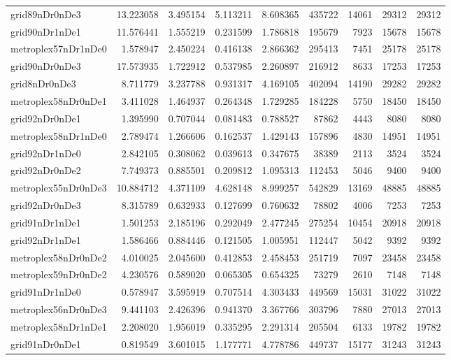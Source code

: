 \documentclass[../../../thesis.tex]{subfiles}
\begin{document}
\begin{longtable}{|l|r|r|r|r|r|r|r|r|}
grid89nDr0nDe3 & 13.223058 & 3.495154 & 5.113211 & 8.608365 & 435722 & 14061 & 29312 & 29312 \\
grid90nDr1nDe1 & 11.576441 & 1.555219 & 0.231599 & 1.786818 & 195679 & 7923 & 15678 & 15678 \\
metroplex57nDr1nDe0 & 1.578947 & 2.450224 & 0.416138 & 2.866362 & 295413 & 7451 & 25178 & 25178 \\
grid90nDr0nDe3 & 17.573935 & 1.722912 & 0.537985 & 2.260897 & 216912 & 8633 & 17253 & 17253 \\
grid8nDr0nDe3 & 8.711779 & 3.237788 & 0.931317 & 4.169105 & 402094 & 14190 & 29282 & 29282 \\
metroplex58nDr0nDe1 & 3.411028 & 1.464937 & 0.264348 & 1.729285 & 184228 & 5750 & 18450 & 18450 \\
grid92nDr0nDe1 & 1.395990 & 0.707044 & 0.081483 & 0.788527 & 87862 & 4443 & 8080 & 8080 \\
metroplex58nDr1nDe0 & 2.789474 & 1.266606 & 0.162537 & 1.429143 & 157896 & 4830 & 14951 & 14951 \\
grid92nDr1nDe0 & 2.842105 & 0.308062 & 0.039613 & 0.347675 & 38389 & 2113 & 3524 & 3524 \\
grid92nDr0nDe2 & 7.749373 & 0.885501 & 0.209812 & 1.095313 & 112453 & 5046 & 9400 & 9400 \\
metroplex55nDr0nDe3 & 10.884712 & 4.371109 & 4.628148 & 8.999257 & 542829 & 13169 & 48885 & 48885 \\
grid92nDr0nDe3 & 8.315789 & 0.632933 & 0.127699 & 0.760632 & 78802 & 4006 & 7253 & 7253 \\
grid91nDr1nDe1 & 1.501253 & 2.185196 & 0.292049 & 2.477245 & 275254 & 10454 & 20918 & 20918 \\
grid92nDr1nDe1 & 1.586466 & 0.884446 & 0.121505 & 1.005951 & 112447 & 5042 & 9392 & 9392 \\
metroplex58nDr0nDe2 & 4.010025 & 2.045600 & 0.412853 & 2.458453 & 251719 & 7097 & 23458 & 23458 \\
metroplex59nDr0nDe2 & 4.230576 & 0.589020 & 0.065305 & 0.654325 & 73279 & 2610 & 7148 & 7148 \\
grid91nDr1nDe0 & 0.578947 & 3.595919 & 0.707514 & 4.303433 & 449569 & 15031 & 31022 & 31022 \\
metroplex56nDr0nDe3 & 9.441103 & 2.426396 & 0.941370 & 3.367766 & 303796 & 7880 & 27013 & 27013 \\
metroplex58nDr1nDe1 & 2.208020 & 1.956019 & 0.335295 & 2.291314 & 205504 & 6133 & 19782 & 19782 \\
grid91nDr0nDe1 & 0.819549 & 3.601015 & 1.177771 & 4.778786 & 449737 & 15177 & 31243 & 31243 \\

\end{longtable}
\end{document}

